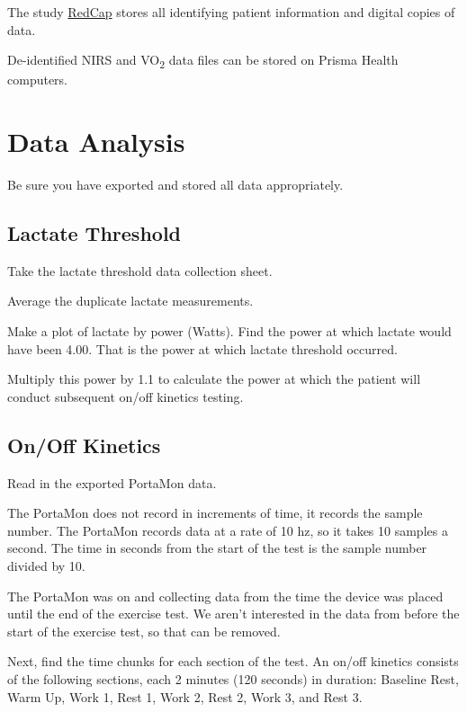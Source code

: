 \documentclass[
]{book}
\begin{document}
The study \href{https://redcap.prismahealth.org}{RedCap} stores all identifying patient information and digital copies of data.

De-identified NIRS and VO\textsubscript{2} data files can be stored on Prisma Health computers.

\hypertarget{DataAnalysis}{%
\chapter{Data Analysis}\label{DataAnalysis}}

Be sure you have exported and stored all data appropriately.

\hypertarget{DataAnalysis-LT}{%
\section{Lactate Threshold}\label{DataAnalysis-LT}}

Take the lactate threshold data collection sheet.

Average the duplicate lactate measurements.

Make a plot of lactate by power (Watts). Find the power at which lactate would have been 4.00. That is the power at which lactate threshold occurred.

Multiply this power by 1.1 to calculate the power at which the patient will conduct subsequent on/off kinetics testing.

\hypertarget{DataAnalysis-Onoff}{%
\section{On/Off Kinetics}\label{DataAnalysis-Onoff}}

Read in the exported PortaMon data.

The PortaMon does not record in increments of time, it records the sample number. The PortaMon records data at a rate of 10 hz, so it takes 10 samples a second. The time in seconds from the start of the test is the sample number divided by 10.

The PortaMon was on and collecting data from the time the device was placed until the end of the exercise test. We aren't interested in the data from before the start of the exercise test, so that can be removed.

Next, find the time chunks for each section of the test. An on/off kinetics consists of the following sections, each 2 minutes (120 seconds) in duration: Baseline Rest, Warm Up, Work 1, Rest 1, Work 2, Rest 2, Work 3, and Rest 3.
\end{document}
